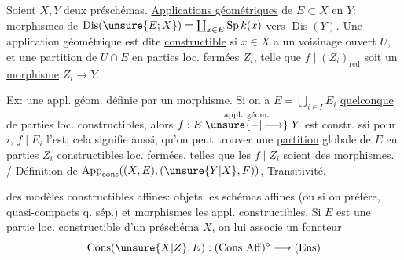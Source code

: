 Soient $X,Y$ deux préschémas. \uline{Applications géométriques} de $E\subset X$ en $Y$: morphismes de $\operatorname{Dis}(\unsure{E;X})=\coprod_{x\in E}\operatorname{Sp}k(x)$ vers $\operatorname{Dis}(Y)$.  Une application géométrique est dite \uline{constructible} si  $x\in X$ a un voisinage ouvert  $U$, et une partition de $U\cap E$ en parties loc. fermées $Z_i$, telle que $f\mid(Z_i)_{\mathrm{red}}$ soit un \uline{morphisme} $Z_i\longrightarrow Y$. 

Ex: une appl. géom. définie par un morphisme. Si on a $E=\bigcup_{i\in I}E_i$  \uline{quelconque} de parties loc. constructibles, alors $f:E\mathrel{\overset{\text{appl. géom.}}{\unsure{-|\longrightarrow}}}Y$ est constr. ssi pour \unsure{$\forall$} $i$, $f\mid E_i$ l'est; cela signifie aussi,  qu'on peut trouver une \uline{partition} globale de $E$ en parties $Z_i$ constructibles loc. fermées, telles que les $f\mid Z_i$ soient des morphismes. / Définition de $\operatorname{App}_{\mathrm{cons}}((X,E),(\unsure{Y|X},F))$, Transitivité.

  des modèles constructibles affines: objets les schémas affines (ou si on préfère, quasi-compacts q. sép.) et morphismes les appl. constructibles. Si $E$ est une partie loc.  constructible d'un préschéma $X$, on lui associe un foncteur
\[
\operatorname{Cons}(\unsure{X|Z},E):(\mathrm{Cons\ Aff})^\circ\longrightarrow(\mathrm{Ens})
\]

